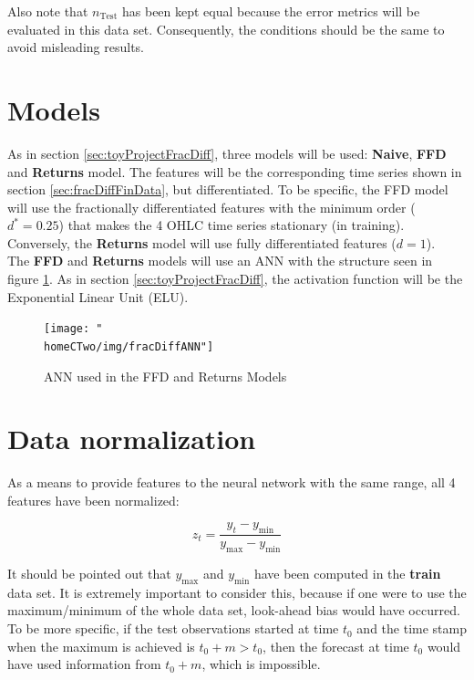 \documentclass[a4paper]{article}
\newcommand{\homeCTwo}{../../Chapter 2 - FracDiff/Draft}
\begin{document}
Also note that $n_{\text{Test}}$ has been kept equal because the error 
metrics will be evaluated in this data set. Consequently, the conditions 
should be the same to avoid misleading results.

\section{Models}
As in section \ref{sec:toyProjectFracDiff}, three models will be used: 
\textbf{Naive}, \textbf{FFD} and \textbf{Returns} model. The features will 
be the corresponding time series shown in section \ref{sec:fracDiffFinData}, 
but differentiated. To be specific, the FFD model will use the fractionally 
differentiated features with the minimum order ($d^* = 0.25$) that makes the 
4 OHLC time series stationary (in training). Conversely, the 
\textbf{Returns} model will use fully differentiated features ($d = 1$).\\

The \textbf{FFD} and \textbf{Returns} models will use an ANN with the 
structure seen in figure \ref{fig:fracDiffANN}. As in section 
\ref{sec:toyProjectFracDiff}, the activation function will be the 
Exponential Linear Unit (ELU).

\begin{figure}[htbp]
	\centering
	\texttt{[image: "\\homeCTwo/img/fracDiffANN"]}
	\caption{ANN used in the FFD and Returns Models}
	\label{fig:fracDiffANN}
\end{figure}

\section{Data normalization}
As a means to provide features to the neural network with the same range, 
all 4 features have been normalized:

\begin{equation*}
	z_t = \frac{y_t - y_{\text{min}}}{y_{\text{max}} - y_{\text{min}}}
\end{equation*}

It should be pointed out that $y_{\text{max}}$ and $y_{\text{min}}$ have 
been computed in the \textbf{train} data set. It is extremely important to 
consider this, because if one were to use the maximum/minimum of the whole 
data set, look-ahead bias would have occurred. To be more specific, if the 
test observations started at time $t_0$ and the time stamp when the maximum 
is achieved is $t_0 + m > t_0$, then the forecast at time $t_0$ would have 
used information from $t_0 + m$, which is impossible.\\
\end{document}
